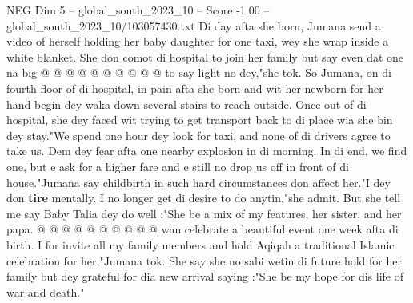 \begin{textsample}{NEG Dim 5 – global\_south\_2023\_10 – Score -1.00 – global\_south\_2023\_10/103057430.txt}
Di day afta she born, Jumana send a video of herself holding her baby daughter for one taxi, wey she wrap inside a white blanket.
She don comot di hospital to join her family but say even dat one na big @ @ @ @ @ @ @ @ @ @ to say light no dey,"she tok.
So Jumana, on di fourth floor of di hospital, in pain afta she born and wit her newborn for her hand begin dey waka down several stairs to reach outside.
Once out of di hospital, she dey faced wit trying to get transport back to di place wia she bin dey stay."We spend one hour dey look for taxi, and none of di drivers agree to take us.
Dem dey fear afta one nearby explosion in di morning.
In di end, we find one, but e ask for a higher fare and e still no drop us off in front of di house."Jumana say childbirth in such hard circumstances don affect her."I dey don \textbf{tire} mentally.
I no longer get di desire to do anytin,"she admit.
But she tell me say Baby Talia dey do well :"She be a mix of my features, her sister, and her papa. @ @ @ @ @ @ @ @ @ @ wan celebrate a beautiful event one week afta di birth.
I for invite all my family members and hold Aqiqah a traditional Islamic celebration for her,"Jumana tok.
She say she no sabi wetin di future hold for her family but dey grateful for dia new arrival saying :"She be my hope for dis life of war and death."

\end{textsample}
